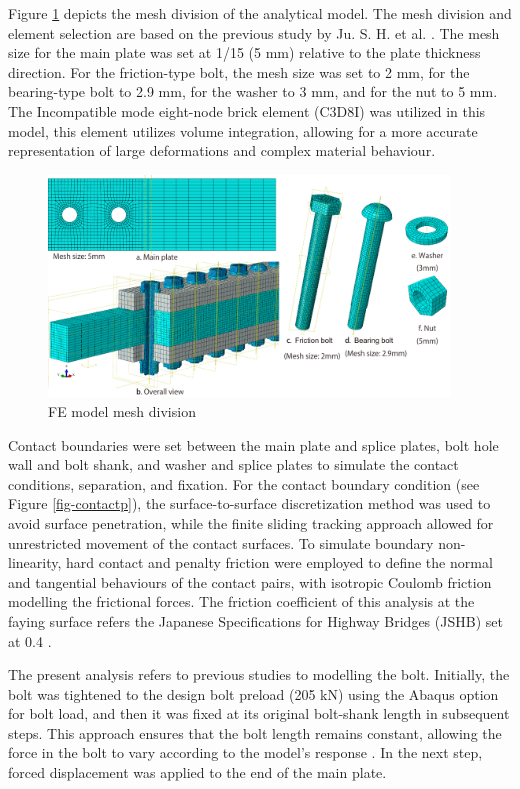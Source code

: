 Figure \ref{fig-femesh} depicts the mesh division of the analytical model. The mesh division and element selection are based on the previous study by Ju. S. H. et al. \cite{ju2004-boltfea}. The mesh size for the main plate was set at 1/15 (5 mm) relative to the plate thickness direction. For the friction-type bolt, the mesh size was set to 2 mm, for the bearing-type bolt to 2.9 mm, for the washer to 3 mm, and for the nut to 5 mm. The Incompatible mode eight-node brick element (C3D8I) was utilized in this model, this element utilizes volume integration, allowing for a more accurate representation of large deformations and complex material behaviour.


\begin{figure}[htbp]
    \centering
    \includegraphics[width=0.95\textwidth]{imgs/ch7/femesh.pdf}
    \caption{FE model mesh division}
    \label{fig-femesh}
\end{figure}

Contact boundaries were set between the main plate and splice plates, bolt hole wall and bolt shank, and washer and splice plates to simulate the contact conditions, separation, and fixation. For the contact boundary condition (see Figure \ref{fig-contactp}), the surface-to-surface discretization method was used to avoid surface penetration, while the finite sliding tracking approach allowed for unrestricted movement of the contact surfaces. To simulate boundary non-linearity, hard contact and penalty friction were employed to define the normal and tangential behaviours of the contact pairs, with isotropic Coulomb friction modelling the frictional forces. The friction coefficient of this analysis at the faying surface refers the Japanese Specifications for Highway Bridges (JSHB) set at 0.4 \cite{douji2017,shishin2009}. 

The present analysis refers to previous studies \cite{Kim2007,hung1996,Shimozato2008ExperrimentalModel} to modelling the bolt. Initially, the bolt was tightened to the design bolt preload (205 kN) using the Abaqus option for bolt load, and then it was fixed at its original bolt-shank length in subsequent steps. This approach ensures that the bolt length remains constant, allowing the force in the bolt to vary according to the model's response \cite{Smith2020}. In the next step, forced displacement was applied to the end of the main plate.

